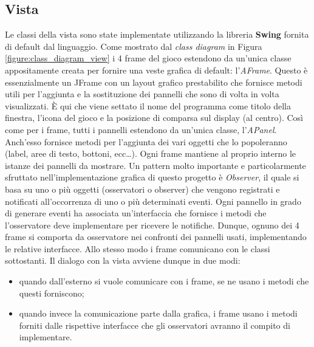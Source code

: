 \subsection{Vista}
Le classi della vista sono state implementate utilizzando la libreria
\textbf{Swing} fornita di default dal linguaggio.\newline
Come mostrato dal \textit{class diagram} in Figura
\ref{figure:class_diagram_view} i 4 frame del gioco estendono da un'unica
classe appositamente creata per fornire una veste grafica di default:
l'\textit{AFrame}. Questo è essenzialmente un JFrame con un layout grafico
prestabilito che fornisce metodi utili per l'aggiunta e la sostituzione dei
pannelli che sono di volta in volta visualizzati. È qui che viene settato il
nome del programma come titolo della finestra, l'icona del gioco e la posizione
di comparsa sul display (al centro).\newline
Così come per i frame, tutti i pannelli estendono da un'unica classe,
l'\textit{APanel}. Anch'esso fornisce metodi per l'aggiunta dei vari oggetti che
lo popoleranno (label, aree di testo, bottoni, ecc\dots). Ogni frame mantiene al
proprio interno le istanze dei pannelli da mostrare.\newline
Un pattern molto importante e particolarmente sfruttato nell'implementazione
grafica di questo progetto è \textit{Observer}, il quale si basa su uno o più
oggetti (osservatori o observer) che vengono registrati e notificati
all'occorrenza di uno o più determinati eventi. Ogni pannello in grado di
generare eventi ha associata un'interfaccia che fornisce i metodi che
l'osservatore deve implementare per ricevere le notifiche. Dunque, ognuno dei 4
frame si comporta da osservatore nei confronti dei pannelli usati, implementando
le relative interfacce. Allo stesso modo i frame comunicano con le classi
sottostanti. Il dialogo con la vista avviene dunque in due modi:
\begin{itemize}
	\item quando dall'esterno si vuole comunicare con i frame, se ne usano i
	metodi che questi forniscono;
	\item quando invece la comunicazione parte dalla grafica, i frame usano i
	metodi forniti dalle rispettive interfacce che gli osservatori avranno il
	compito di implementare.
\end{itemize}



